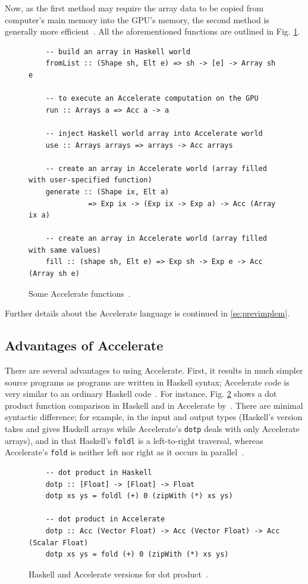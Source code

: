 Now, as the first method may require the array data to be copied from computer's main memory into the GPU's memory, the second method is generally more efficient~\cite{Mar13}. All the aforementioned functions are outlined in Fig. \ref{fig:acc-functions}.

\begin{figure}
  \begin{lstlisting}
    -- build an array in Haskell world
    fromList :: (Shape sh, Elt e) => sh -> [e] -> Array sh e

	-- to execute an Accelerate computation on the GPU
    run :: Arrays a => Acc a -> a
    
    -- inject Haskell world array into Accelerate world
    use :: Arrays arrays => arrays -> Acc arrays
    
    -- create an array in Accelerate world (array filled with user-specified function)
    generate :: (Shape ix, Elt a) 
              => Exp ix -> (Exp ix -> Exp a) -> Acc (Array ix a)
    
    -- create an array in Accelerate world (array filled with same values)
    fill :: (shape sh, Elt e) => Exp sh -> Exp e -> Acc (Array sh e)
  \end{lstlisting}
  \caption{Some Accelerate functions~\cite{Mar13}.}
  \label{fig:acc-functions}
\end{figure}

Further details about the Accelerate language is continued in \ref{se:previmplem}.

\subsection{Advantages of Accelerate}\label{se:acc-adv}

There are several advantages to using Accelerate. First, it results in much simpler source programs as programs are written in Haskell syntax; Accelerate code is very similar to an ordinary Haskell code~\cite{Mar13}. For instance, Fig. \ref{fig:dotp} shows a dot product function comparison in Haskell and in Accelerate by~\cite{McD13}. There are minimal syntactic difference; for example, in the input and output types (Haskell's version takes and gives Haskell arrays while Accelerate's \texttt{dotp} deals with only Accelerate arrays), and in that Haskell's \texttt{foldl} is a left-to-right traversal, whereas Accelerate's \texttt{fold} is neither left nor right as it occurs in parallel~\cite{McD13}.

\begin{figure}
  \begin{lstlisting}
    -- dot product in Haskell
    dotp :: [Float] -> [Float] -> Float
    dotp xs ys = foldl (+) 0 (zipWith (*) xs ys)
           
    -- dot product in Accelerate
    dotp :: Acc (Vector Float) -> Acc (Vector Float) -> Acc (Scalar Float)
    dotp xs ys = fold (+) 0 (zipWith (*) xs ys)
  \end{lstlisting}
  \caption{Haskell and Accelerate versions for dot product~\cite{McD13}.}
  \label{fig:dotp}
\end{figure}


